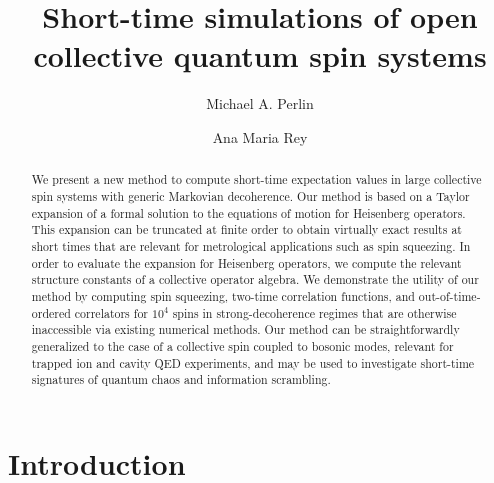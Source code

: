 \documentclass[pra,twocolumn,longbibliography]{revtex4-2}
\newcommand{\1}{\mathds{1}}
\begin{document}
\title{Short-time simulations of open collective quantum spin systems}

\author{Michael A. Perlin}
\author{Ana Maria Rey}

\begin{abstract}
  We present a new method to compute short-time expectation values in
  large collective spin systems with generic Markovian decoherence.
  Our method is based on a Taylor expansion of a formal solution to
  the equations of motion for Heisenberg operators.  This expansion
  can be truncated at finite order to obtain virtually exact results
  at short times that are relevant for metrological applications such
  as spin squeezing.  In order to evaluate the expansion for
  Heisenberg operators, we compute the relevant structure constants of
  a collective operator algebra.  We demonstrate the utility of our
  method by computing spin squeezing, two-time correlation functions,
  and out-of-time-ordered correlators for $10^4$ spins in
  strong-decoherence regimes that are otherwise inaccessible via
  existing numerical methods.  Our method can be straightforwardly
  generalized to the case of a collective spin coupled to bosonic
  modes, relevant for trapped ion and cavity QED experiments, and may
  be used to investigate short-time signatures of quantum chaos and
  information scrambling.
\end{abstract}

\maketitle

\section{Introduction}
\end{document}
